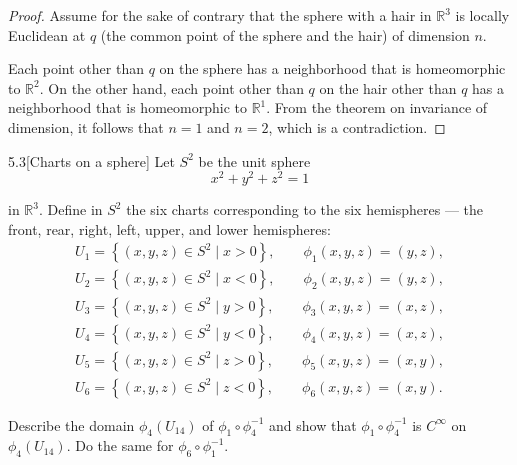 \begin{proof}
	Assume for the sake of contrary that the sphere with a hair in \( \mathbb{R}^{3} \) is locally Euclidean at \( q \) (the common point of the sphere and the hair) of dimension \( n \).

	Each point other than \( q \) on the sphere has a neighborhood that is homeomorphic to \( \mathbb{R}^{2} \). On the other hand, each point other than \( q \) on the hair other than \( q \) has a neighborhood that is homeomorphic to \( \mathbb{R}^{1} \). From the theorem on invariance of dimension, it follows that \( n = 1 \) and \( n = 2 \), which is a contradiction.
\end{proof}

\begin{problem}{5.3}[Charts on a sphere]
Let \( S^{2} \) be the unit sphere
\[
	x^{2} + y^{2} + z^{2} = 1
\]

in \( \mathbb{R}^{3} \). Define in \( S^{2} \) the six charts corresponding to the six hemispheres --- the front, rear, right, left, upper, and lower hemispheres:
\begin{align*}
	U_{1} = \left\{ (x, y, z) \in S^{2} \mid x > 0 \right\}, \qquad \phi_{1}(x, y, z) = (y, z), \\
	U_{2} = \left\{ (x, y, z) \in S^{2} \mid x < 0 \right\}, \qquad \phi_{2}(x, y, z) = (y, z), \\
	U_{3} = \left\{ (x, y, z) \in S^{2} \mid y > 0 \right\}, \qquad \phi_{3}(x, y, z) = (x, z), \\
	U_{4} = \left\{ (x, y, z) \in S^{2} \mid y < 0 \right\}, \qquad \phi_{4}(x, y, z) = (x, z), \\
	U_{5} = \left\{ (x, y, z) \in S^{2} \mid z > 0 \right\}, \qquad \phi_{5}(x, y, z) = (x, y), \\
	U_{6} = \left\{ (x, y, z) \in S^{2} \mid z < 0 \right\}, \qquad \phi_{6}(x, y, z) = (x, y).
\end{align*}

Describe the domain \( \phi_{4}(U_{14}) \) of \( \phi_{1} \circ \phi_{4}^{-1} \) and show that \( \phi_{1} \circ \phi_{4}^{-1} \) is \( C^{\infty} \) on \( \phi_{4}(U_{14}) \). Do the same for \( \phi_{6} \circ \phi_{1}^{-1} \).
\end{problem}


